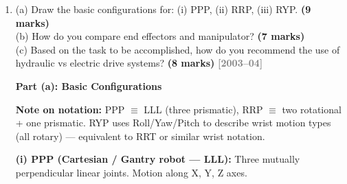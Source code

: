 \documentclass[12pt,a3paper]{article}
\newcommand{\yr}[1]{\hfill\textcolor{gray}{\small\textbf{[#1]}}}
\newcommand{\mk}[1]{\textcolor{orange!70!black}{\small\textbf{(#1 marks)}}}
\begin{document}
\begin{enumerate}
\begin{tcolorbox}[enhanced,breakable,ansbox,colback=cA!4,colframe=cA,
  boxrule=0.8pt,arc=5pt,
  title={\textbf{Answer}},fonttitle=\bfseries\color{white},colbacktitle=cA]
\textbf{Conclusion:} Robots are powerful tools for amplifying human productivity
in well-defined, repetitive tasks. However, they complement rather than replace
human intelligence, creativity, and wisdom — especially at the highest levels
of human achievement. The role of robotics is to free extraordinary humans from
ordinary work, allowing them to focus on what machines can never do.

\end{tcolorbox}

\item \label{qlabel:C1-Q15}
(a) Draw the basic configurations for: (i) PPP, (ii) RRP, (iii) RYP. \mk{9}\\
(b) How do you compare end effectors and manipulator? \mk{7}\\
(c) Based on the task to be accomplished, how do you recommend the use of hydraulic vs electric drive systems? \mk{8}
\yr{2003--04}

\begin{tcolorbox}[enhanced,breakable,ansbox,colback=cA!4,colframe=cA,
  boxrule=0.8pt,arc=5pt,
  title={\textbf{Answer}},fonttitle=\bfseries\color{white},colbacktitle=cA]

\textbf{Part (a): Basic Configurations}

\textbf{Note on notation:} PPP $\equiv$ LLL (three prismatic), RRP $\equiv$
two rotational + one prismatic. RYP uses Roll/Yaw/Pitch to describe wrist
motion types (all rotary) — equivalent to RRT or similar wrist notation.

\textbf{(i) PPP (Cartesian / Gantry robot — LLL):}
Three mutually perpendicular linear joints. Motion along X, Y, Z axes.

\begin{center}
\end{center}
\end{tcolorbox}
\end{enumerate}
\end{document}
